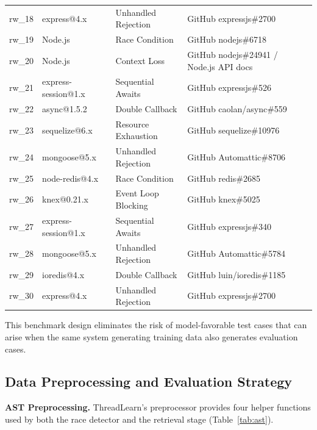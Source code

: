 \documentclass[runningheads]{llncs}
\begin{document}
\begin{table}[H]
\begin{tabular}{@{}lllp{3.8cm}@{}}
    rw\_18 & express@4.x           & Unhandled Rejection & GitHub expressjs\#2700 \\
    rw\_19 & Node.js               & Race Condition      & GitHub nodejs\#6718 \\
    rw\_20 & Node.js               & Context Loss        & GitHub nodejs\#24941 / Node.js API docs \\
    rw\_21 & express-session@1.x   & Sequential Awaits   & GitHub expressjs\#526 \\
    rw\_22 & async@1.5.2           & Double Callback     & GitHub caolan/async\#559 \\
    rw\_23 & sequelize@6.x         & Resource Exhaustion & GitHub sequelize\#10976 \\
    rw\_24 & mongoose@5.x          & Unhandled Rejection & GitHub Automattic\#8706 \\
    rw\_25 & node-redis@4.x        & Race Condition      & GitHub redis\#2685 \\
    rw\_26 & knex@0.21.x           & Event Loop Blocking & GitHub knex\#5025 \\
    rw\_27 & express-session@1.x   & Sequential Awaits   & GitHub expressjs\#340 \\
    rw\_28 & mongoose@5.x          & Unhandled Rejection & GitHub Automattic\#5784 \\
    rw\_29 & ioredis@4.x           & Double Callback     & GitHub luin/ioredis\#1185 \\
    rw\_30 & express@4.x           & Unhandled Rejection & GitHub expressjs\#2700 \\
    \bottomrule
  \end{tabular}
\end{table}

This benchmark design eliminates the risk of model-favorable test cases
that can arise when the same system generating training data also
generates evaluation cases.

\subsection{Data Preprocessing and Evaluation Strategy}
\label{sec:design:preprocess}

\textbf{AST Preprocessing.}
ThreadLearn's preprocessor provides four helper functions used by both
the race detector and the retrieval stage (Table~\ref{tab:ast}).
\end{document}
